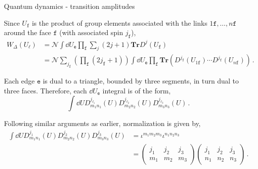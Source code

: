 \documentclass{beamer}
\begin{document}
\begin{frame}{Quantum dynamics - transition amplitudes}
    \begin{list}{\maltese}{\leftmargin=1em \itemindent=0em}
        \item<1-> Since $U_\mathtt{f}$ is the product of group elements associated with the links $1\mathtt{f},\dots,n\mathtt{f}$ around the face $\mathtt{f}$ (with associated spin $j_\mathtt{f}$),
        \begin{align*}
            W_\Delta(U_\ell)&=\mathcal{N}\int\dd{U_\mathtt{e}}\prod_\mathtt{f}\sum_j(2j+1)\mathbf{Tr}D^{j}(U_\mathtt{f})\,\\
            &=\mathcal{N}\sum_{j_\mathtt{f}}\left(\prod_\mathtt{f}(2j_\mathtt{f}+1)\right)\int\dd{U_\mathtt{e}}\prod_\mathtt{f}\mathbf{Tr}\left(D^{j_\mathtt{f}}(U_{1\mathtt{f}})\cdots D^{j_\mathtt{f}}(U_{n\mathtt{f}})\right)\,.
        \end{align*}
        \item<2-> Each edge $\mathtt{e}$ is dual to a triangle, bounded by three segments, in turn dual to three faces. Therefore, each $\dd{U_\mathtt{e}}$ integral is of the form,
        \begin{equation}
            \int\dd{U}D^{j_{\ell_1}}_{m_1n_1}(U)D^{j_{\ell_2}}_{m_2n_2}(U)D^{j_{\ell_3}}_{m_3n_3}(U)\,.
        \end{equation}
        \item<3-> Following similar arguments as earlier, normalization is given by,
        \begin{align*}
            \int\dd{U}D^{j_{1}}_{m_1n_1}(U)D^{j_{2}}_{m_2n_2}(U)D^{j_{3}}_{m_3n_3}(U)&=\iota^{m_1m_2m_3}\iota^{n_1n_2n_3} \\ &=
            \begin{pmatrix}
                j_1 & j_2 & j_3 \\
                m_1 & m_2 & m_3
            \end{pmatrix}
            \begin{pmatrix}
                j_1 & j_2 & j_3 \\
                n_1 & n_2 & n_3
            \end{pmatrix}\,.
        \end{align*}
    \end{list}
\end{frame}
\end{document}
